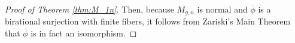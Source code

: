 \documentclass{amsart}
\newcommand{\mc}{\mathcal}
\newcommand{\sslash}{\mathbin{/\mkern-6mu/}}
\newcommand{\diag}{\text{diag}}
\numberwithin{equation}{section}
\theoremstyle{definition}
\begin{document}
\begin{proof}[Proof of Theorem \ref{thm:M_1n}]

Then, because $M_{g,n}$ is normal and $\overline{\phi}$ is a birational surjection with finite fibers, it follows from Zariski's Main Theorem \cite[Corollary 12.88]{Gortz10} that $\overline{\phi}$ is in fact an isomorphism.
\end{proof}



\printbibliography
\end{document}

